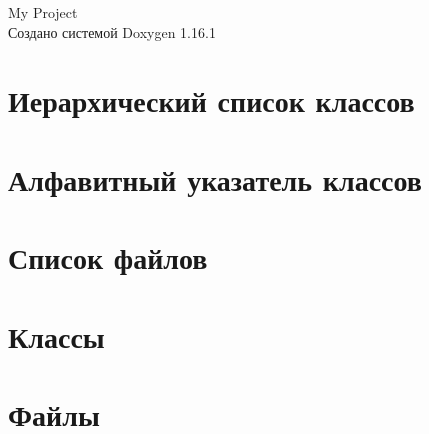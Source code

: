 \documentclass[twoside]{book}
\newcommand{\+}{\discretionary{\mbox{\scriptsize$\hookleftarrow$}}{}{}}
\newcommand{\clearemptydoublepage}{%
    \newpage{\pagestyle{empty}\cleardoublepage}%
  }
\begin{document}
  \raggedbottom
    \hypersetup{pageanchor=false,
                bookmarksnumbered=true,
                pdfencoding=unicode
               }
  \begin{titlepage}
  \vspace*{7cm}
  \begin{center}%
  {\Large My Project}\\
  \vspace*{1cm}
  {\large Создано системой Doxygen 1.16.1}\\
  \end{center}
  \end{titlepage}
  \clearemptydoublepage
  \tableofcontents
  \clearemptydoublepage
  \hypersetup{pageanchor=true}
\chapter{Иерархический список классов}

\chapter{Алфавитный указатель классов}

\chapter{Список файлов}

\chapter{Классы}






\chapter{Файлы}





  \backmatter
  \newpage
  \clearemptydoublepage
  \printindex
\end{document}
